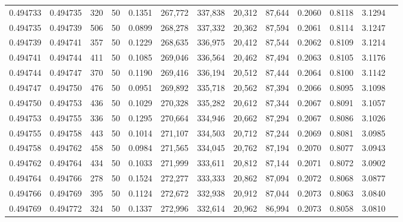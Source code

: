 \begin{tabular}{rrrrrrrrrrrrr}
0.494733 & 0.494735 &   320 &  50 &                                     0.1351 & 267,772 & 337,838 &  20,312 &  87,644 & 0.2060 & 0.8118 & 3.1294 \\
0.494735 & 0.494739 &   506 &  50 &                                     0.0899 & 268,278 & 337,332 &  20,362 &  87,594 & 0.2061 & 0.8114 & 3.1247 \\
0.494739 & 0.494741 &   357 &  50 &                                     0.1229 & 268,635 & 336,975 &  20,412 &  87,544 & 0.2062 & 0.8109 & 3.1214 \\
0.494741 & 0.494744 &   411 &  50 &                                     0.1085 & 269,046 & 336,564 &  20,462 &  87,494 & 0.2063 & 0.8105 & 3.1176 \\
0.494744 & 0.494747 &   370 &  50 &                                     0.1190 & 269,416 & 336,194 &  20,512 &  87,444 & 0.2064 & 0.8100 & 3.1142 \\
0.494747 & 0.494750 &   476 &  50 &                                     0.0951 & 269,892 & 335,718 &  20,562 &  87,394 & 0.2066 & 0.8095 & 3.1098 \\
0.494750 & 0.494753 &   436 &  50 &                                     0.1029 & 270,328 & 335,282 &  20,612 &  87,344 & 0.2067 & 0.8091 & 3.1057 \\
0.494753 & 0.494755 &   336 &  50 &                                     0.1295 & 270,664 & 334,946 &  20,662 &  87,294 & 0.2067 & 0.8086 & 3.1026 \\
0.494755 & 0.494758 &   443 &  50 &                                     0.1014 & 271,107 & 334,503 &  20,712 &  87,244 & 0.2069 & 0.8081 & 3.0985 \\
0.494758 & 0.494762 &   458 &  50 &                                     0.0984 & 271,565 & 334,045 &  20,762 &  87,194 & 0.2070 & 0.8077 & 3.0943 \\
0.494762 & 0.494764 &   434 &  50 &                                     0.1033 & 271,999 & 333,611 &  20,812 &  87,144 & 0.2071 & 0.8072 & 3.0902 \\
0.494764 & 0.494766 &   278 &  50 &                                     0.1524 & 272,277 & 333,333 &  20,862 &  87,094 & 0.2072 & 0.8068 & 3.0877 \\
0.494766 & 0.494769 &   395 &  50 &                                     0.1124 & 272,672 & 332,938 &  20,912 &  87,044 & 0.2073 & 0.8063 & 3.0840 \\
0.494769 & 0.494772 &   324 &  50 &                                     0.1337 & 272,996 & 332,614 &  20,962 &  86,994 & 0.2073 & 0.8058 & 3.0810 \\

\end{tabular}

